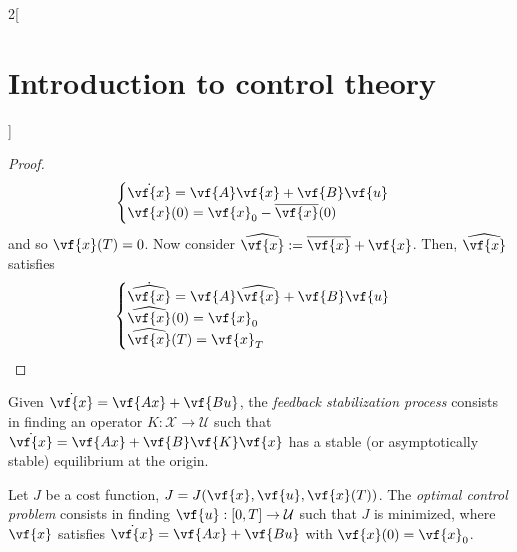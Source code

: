 \documentclass[../../../main_math.tex]{subfiles}
\begin{document}
\begin{multicols}{2}[\section{Introduction to control theory}]
\begin{proof}
    $$
      \begin{cases}
        \dot{\vf{x}} = \vf{A}\vf{x} + \vf{B}\vf{u} \\
        \vf{x}(0) = \vf{x}_0-\overline{\vf{x}}(0)
      \end{cases}
    $$
    and so $\vf{x}(T) = 0$. Now consider $\widehat{\vf{x}}:= \overline{\vf{x}} + \vf{x}$. Then, $\widehat{\vf{x}}$ satisfies
    $$
      \begin{cases}
        \dot{\widehat{\vf{x}}} = \vf{A}\widehat{\vf{x}} + \vf{B}\vf{u} \\
        \widehat{\vf{x}}(0) = \vf{x}_0                                 \\
        \widehat{\vf{x}}(T) = \vf{x}_T
      \end{cases}
    $$
  \end{proof}
  \begin{definition}
    Given $\dot{\vf{x}}=\vf{Ax}+\vf{Bu}$, the \emph{feedback stabilization process} consists in finding an operator $K:\mathcal{X}\to\mathcal{U}$ such that $\dot{\vf{x}}=\vf{Ax}+\vf{B}\vf{K}\vf{x}$ has a stable (or asymptotically stable) equilibrium at the origin.
  \end{definition}
  \begin{definition}
    Let $J$ be a cost function, $J=J(\vf{x}, \vf{u},\vf{x}(T))$. The \emph{optimal control problem} consists in finding $\vf{u}: [0,T]\to \mathcal{U}$ such that $J$ is minimized, where $\vf{x}$ satisfies $\dot{\vf{x}} = \vf{Ax} + \vf{Bu}$ with $\vf{x}(0) = \vf{x}_0$.
  \end{definition}

\end{multicols}
\end{document}
